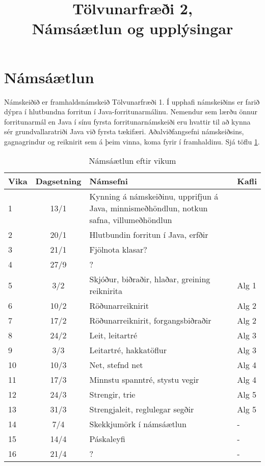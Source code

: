 \documentclass{article}
\title{Tölvunarfræði 2, \semester \\ Námsáætlun og upplýsingar}
\author{}
\begin{document}
\maketitle
{}

\section{Námsáætlun}
\label{sec:schedule}

Námskeiðið er framhaldsnámskeið Tölvunarfræði 1. Í upphafi námskeiðins er farið dýpra í hlutbundna forritun í Java-forritunarmálinu. Nemendur sem lærðu önnur forritunarmál en Java í sínu fyrsta forritunarnámskeiði eru hvattir til að kynna sér grundvallaratriði Java við fyrsta tækifæri. Aðalviðfangsefni námskeiðsins, gagnagrindur og reiknirit sem á þeim vinna, koma fyrir í framhaldinu. Sjá  töflu \ref{tab:schedule}.

\begin{table}
\caption{Námsáætlun eftir vikum}
\label{tab:schedule}
\begin{center}
\renewcommand{\arraystretch}{1.2}
\begin{tabularx}{\linewidth}{lcXp{1cm}}
\toprule
Vika&Dagsetning&Námsefni&Kafli\\
\midrule
1	&13/1	& Kynning á námskeiðinu, upprifjun á Java, minnismeðhöndlun, notkun safna, villumeðhöndlun&\\
2	&20/1	& Hlutbundin forritun í Java, erfðir&\\
3	&21/1	& Fjölnota klasar?&\\
4	&27/9	& ?&\\
5	&3/2	& Skjóður, biðraðir, hlaðar, greining reiknirita&Alg 1\\
6	&10/2	& Röðunarreiknirit&Alg 2\\
7	&17/2	& Röðunarreiknirit, forgangsbiðraðir&Alg 2\\
8	&24/2	& Leit, leitartré&Alg 3\\
9	&3/3	& Leitartré, hakkatöflur&Alg 3\\
10	&10/3	& Net, stefnd net&Alg 4\\
11	&17/3	& Minnstu spanntré, stystu vegir&Alg 4\\
12	&24/3	& Strengir, trie&Alg 5\\
13	&31/3	& Strengjaleit, reglulegar segðir&Alg 5\\
14	&7/4	& Skekkjumörk í námsáætlun&-\\
15	&14/4	& Páskaleyfi&-\\
16	&21/4	& ?&-\\
\bottomrule
\end{tabularx}
\end{center}
\end{table}
\end{document}
